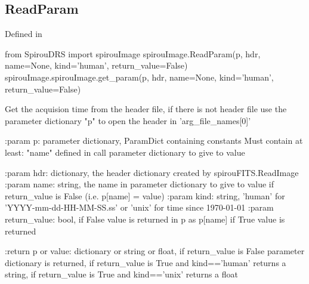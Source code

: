 \noindent\begin{minipage}{\textwidth}
\subsection{ReadParam}

Defined in \spirouImage{}

\begin{pythonbox}
from SpirouDRS import spirouImage
spirouImage.ReadParam(p, hdr, name=None, kind='human', return_value=False)
spirouImage.spirouImage.get_param(p, hdr, name=None, kind='human', return_value=False)
\end{pythonbox}

\begin{pythondocstring}
Get the acquision time from the header file, if there is not header file
use the parameter dictionary "p" to open the header in 'arg_file_names[0]'

:param p: parameter dictionary, ParamDict containing constants
    Must contain at least:
        "name" defined in call
        parameter dictionary to give to value

:param hdr: dictionary, the header dictionary created by
            spirouFITS.ReadImage
:param name: string, the name in parameter dictionary to give to value
             if return_value is False (i.e. p[name] = value)
:param kind: string, 'human' for 'YYYY-mm-dd-HH-MM-SS.ss' or 'unix'
             for time since 1970-01-01
:param return_value: bool, if False value is returned in p as p[name]
                     if True value is returned

:return p or value: dictionary or string or float, if return_value is False
                    parameter dictionary is returned, if return_value is
                    True and kind=='human' returns a string, if return_value
                    is True and kind=='unix' returns a float
\end{pythondocstring}
\end{minipage}


